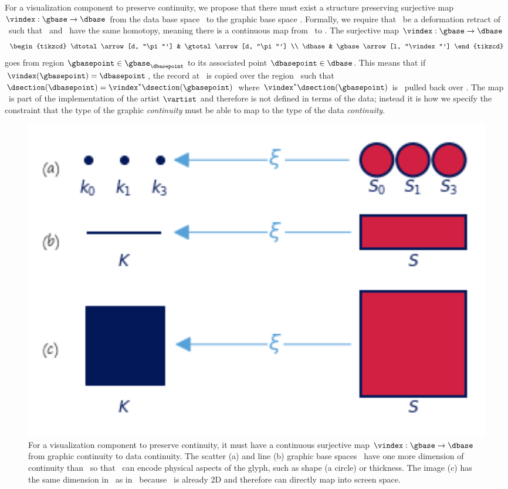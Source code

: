 \documentclass[../main.tex]{subfiles}
\begin{document}
For a visualization component to preserve continuity, we propose that there must exist a structure preserving surjective map \(\vindex: \gbase\rightarrow\dbase\) from the data base space \dbase\ to the graphic base space \gbase. Formally, we require that \dbase\ be a deformation retract\cite{RetractionTopology2020} of \gbase\ such that \dbase\ and \gbase\ have the same homotopy, meaning there is a continuous map from \gbase\ to \dbase\cite{weissteinHomotopy}. The surjective map \(\vindex: \gbase \rightarrow \dbase\)
\begin{equation}
    \begin{tikzcd}
        \dtotal \arrow[d, "\pi"'] & \gtotal \arrow[d, "\pi"'] \\
        \dbase                   & \gbase \arrow[l, "\vindex"']
    \end{tikzcd}
    \label{eq:math:graphic:vindex}
\end{equation}
goes from region \(\gbasepoint \in \gbase_{\dbasepoint}\) to its associated point \(\dbasepoint \in \dbase\). This means that if \(\vindex(\gbasepoint) = \dbasepoint\), the record at \dbasepoint\ is copied over the region \gbasepoint\ such that \(\dsection(\dbasepoint)=\vindex^*\dsection(\gbasepoint)\) where \(\vindex^*\dsection(\gbasepoint)\)  is \dsection\ pulled back over \gbase. The map \vindex\ is part of the implementation of the artist \(\mathcal{\vartist}\) and therefore is not defined in terms of the data; instead it is how we specify the constraint that the type of the graphic \textit{continuity} must be able to map to the type of the data \textit{continuity}.

\begin{figure}[H]
    \includegraphics[width=1\textwidth]{figures/math/retraction_maps.png}
    \caption{For a visualization component to preserve continuity, it must have a continuous surjective map $\vindex: \gbase\rightarrow\dbase$ from graphic continuity to data continuity. The scatter (a) and line (b) graphic base spaces \gbase\ have one more dimension of continuity than \dbase\ so that \gbase\ can encode physical aspects of the glyph, such as shape (a circle) or thickness. The image (c) has the same dimension in \gbase\ as in \dbase\ because \dbase\ is already 2D and therefore can directly map into screen space.}
    \label{fig:math:graphic:retraction:map}
\end{figure}
\end{document}
